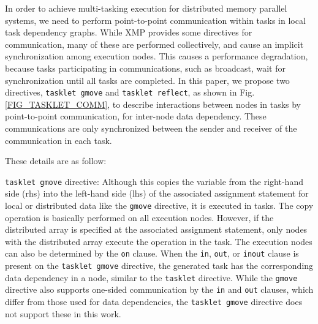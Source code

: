 ﻿\documentclass[graybox]{svmult}
\begin{document}
In order to achieve multi-tasking execution for distributed memory parallel systems, we need to perform point-to-point communication within tasks in local task dependency graphs. While XMP provides some directives for communication, many of these are performed collectively, and cause an implicit synchronization among execution nodes. This causes a performance degradation, because tasks participating in communications, such as broadcast, wait for synchronization until all tasks are completed. In this paper, we propose two directives, {\tt tasklet gmove} and {\tt tasklet reflect}, as shown in Fig. \ref{FIG_TASKLET_COMM}, to describe interactions between nodes in tasks by point-to-point communication, for inter-node data dependency. These communications are only synchronized between the sender and receiver of the communication in each task. 

These details are as follow:

{\tt tasklet gmove} directive: Although this copies the variable from the right-hand side (rhs) into the left-hand side (lhs) of the associated assignment statement for local or distributed data like the {\tt gmove} directive, it is executed in tasks. The copy operation is basically performed on all execution nodes. However, if the distributed array is specified at the associated assignment statement, only nodes with the distributed array execute the operation in the task. The execution nodes can also be determined by the {\tt on} clause. When the {\tt in}, {\tt out}, or {\tt inout} clause is present on the {\tt tasklet gmove} directive, the generated task has the corresponding data dependency in a node, similar to the {\tt tasklet} directive. While the {\tt gmove} directive also supports one-sided communication by the {\tt in} and {\tt out} clauses, which differ from those used for data dependencies, the {\tt tasklet gmove} directive does not support these in this work.
\end{document}
